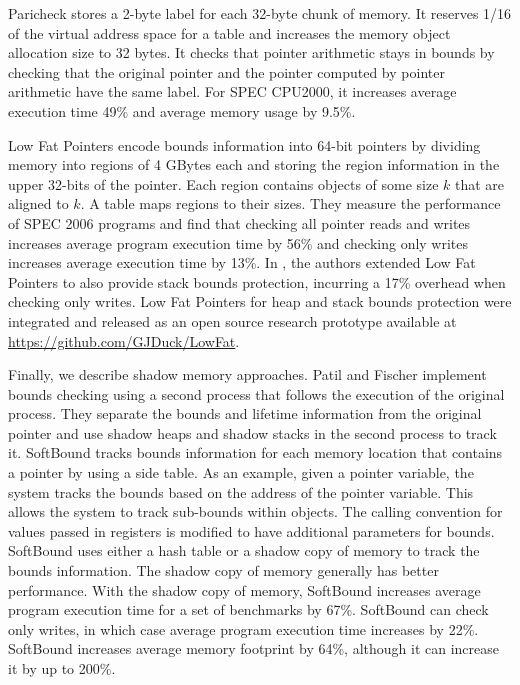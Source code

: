 Paricheck \cite{Younan2010} stores a 2-byte label for each 32-byte chunk of memory.
It reserves 1/16 of the virtual address space for a table and increases
the memory object allocation size to 32 bytes.
It checks that pointer arithmetic stays in bounds by checking that the
original pointer and the pointer computed by pointer arithmetic have the
same label. For SPEC CPU2000, it increases average execution time 49\% and
average  memory usage by 9.5\%.

Low Fat Pointers \cite{Duck2016} encode bounds information into 64-bit pointers by
dividing memory into  regions of 4 GBytes each and storing
the region information in the upper 32-bits of the pointer.  Each
region contains objects of some size $k$ that are aligned to $k$.
A table maps regions to their sizes.  They measure the performance of 
SPEC 2006 programs and find that checking all pointer reads and writes
increases average program execution time by 56\% and checking only writes 
increases average execution time by 13\%. In \cite{Duck2017}, the authors extended 
Low Fat Pointers to also provide stack bounds protection, incurring a 17\% overhead when checking 
only writes. Low Fat Pointers for heap \cite{Duck2016} and stack \cite{Duck2017} bounds protection were
integrated and released as an open source research prototype available at 
\url{https://github.com/GJDuck/LowFat}.

Finally, we describe shadow memory approaches.
Patil and Fischer \cite{Patil1997}
implement bounds checking using a second process that follows the execution 
of the original process.  They separate the bounds and lifetime information
from the original pointer and use shadow heaps and shadow stacks in the
second process to track it.  
SoftBound \cite{Nagarakatte2009} tracks bounds information
for each  memory location that contains a pointer by using a side table.  
As an example, given a pointer variable,
the system tracks the bounds based on the address of the pointer variable.
This allows the system to track sub-bounds within objects.  The calling
convention for values passed in registers is modified to have additional
parameters for bounds.  SoftBound uses either a hash table or
a shadow copy of memory to track the bounds information.   The shadow
copy of memory generally has better performance.  With the shadow
copy of memory, SoftBound increases average program execution time for
a set of benchmarks by 67\%.   SoftBound can check only writes, in which
case average program execution time increases by 22\%.   SoftBound increases 
average memory footprint by 64\%, although it can increase it by up to 200\%.

